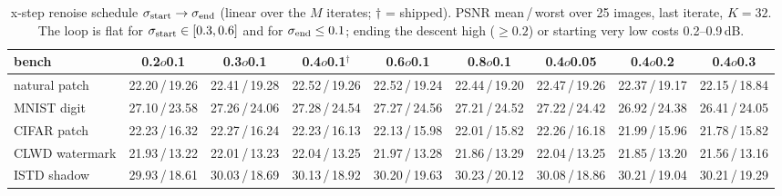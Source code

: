 \begin{table}[t]
\centering\small
\caption{x-step renoise schedule $\sigma_{\rm start}\to\sigma_{\rm end}$ (linear over the $M$ iterates; $\dagger$ = shipped). PSNR mean\,/\,worst over 25 images, last iterate, $K{=}32$. The loop is flat for $\sigma_{\rm start}\in[0.3,0.6]$ and for $\sigma_{\rm end}\le 0.1$; ending the descent high ($\ge 0.2$) or starting very low costs 0.2--0.9\,dB.}
\label{tab:ablation_sigma}
\begin{tabular}{lcccccccc}
\toprule
bench & 0.2$	o$0.1 & 0.3$	o$0.1 & 0.4$	o$0.1$^\dagger$ & 0.6$	o$0.1 & 0.8$	o$0.1 & 0.4$	o$0.05 & 0.4$	o$0.2 & 0.4$	o$0.3 \\
\midrule
natural patch & 22.20\,/\,19.26 & 22.41\,/\,19.28 & 22.52\,/\,19.26 & 22.52\,/\,19.24 & 22.44\,/\,19.20 & 22.47\,/\,19.26 & 22.37\,/\,19.17 & 22.15\,/\,18.84 \\
MNIST digit & 27.10\,/\,23.58 & 27.26\,/\,24.06 & 27.28\,/\,24.54 & 27.27\,/\,24.56 & 27.21\,/\,24.52 & 27.22\,/\,24.42 & 26.92\,/\,24.38 & 26.41\,/\,24.05 \\
CIFAR patch & 22.23\,/\,16.32 & 22.27\,/\,16.24 & 22.23\,/\,16.13 & 22.13\,/\,15.98 & 22.01\,/\,15.82 & 22.26\,/\,16.18 & 21.99\,/\,15.96 & 21.78\,/\,15.82 \\
CLWD watermark & 21.93\,/\,13.22 & 22.01\,/\,13.23 & 22.04\,/\,13.25 & 21.97\,/\,13.28 & 21.86\,/\,13.29 & 22.04\,/\,13.25 & 21.85\,/\,13.20 & 21.56\,/\,13.16 \\
ISTD shadow & 29.93\,/\,18.61 & 30.03\,/\,18.69 & 30.13\,/\,18.92 & 30.20\,/\,19.63 & 30.23\,/\,20.12 & 30.08\,/\,18.86 & 30.21\,/\,19.04 & 30.21\,/\,19.29 \\
\bottomrule
\end{tabular}
\end{table}
